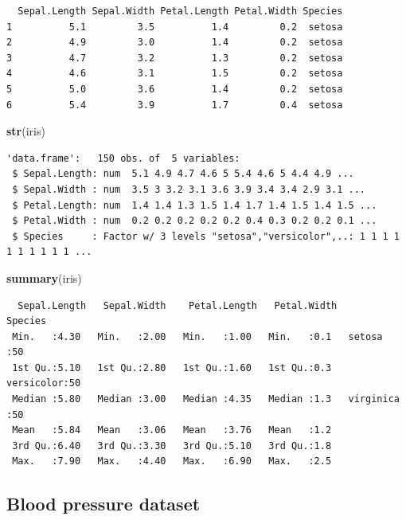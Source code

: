 \documentclass[11pt,a4paper]{book}
\newenvironment{Shaded}{\begin{snugshade}}{\end{snugshade}}
\newcommand{\KeywordTok}[1]{\textcolor[rgb]{0.13,0.29,0.53}{\textbf{#1}}}
\newcommand{\NormalTok}[1]{#1}
\theoremstyle{definition}
\theoremstyle{definition}
\theoremstyle{definition}
\theoremstyle{remark}
\begin{document}
\begin{verbatim}
  Sepal.Length Sepal.Width Petal.Length Petal.Width Species
1          5.1         3.5          1.4         0.2  setosa
2          4.9         3.0          1.4         0.2  setosa
3          4.7         3.2          1.3         0.2  setosa
4          4.6         3.1          1.5         0.2  setosa
5          5.0         3.6          1.4         0.2  setosa
6          5.4         3.9          1.7         0.4  setosa
\end{verbatim}

\begin{Shaded}
\begin{Highlighting}[]
\KeywordTok{str}\NormalTok{(iris)}
\end{Highlighting}
\end{Shaded}

\begin{verbatim}
'data.frame':   150 obs. of  5 variables:
 $ Sepal.Length: num  5.1 4.9 4.7 4.6 5 5.4 4.6 5 4.4 4.9 ...
 $ Sepal.Width : num  3.5 3 3.2 3.1 3.6 3.9 3.4 3.4 2.9 3.1 ...
 $ Petal.Length: num  1.4 1.4 1.3 1.5 1.4 1.7 1.4 1.5 1.4 1.5 ...
 $ Petal.Width : num  0.2 0.2 0.2 0.2 0.2 0.4 0.3 0.2 0.2 0.1 ...
 $ Species     : Factor w/ 3 levels "setosa","versicolor",..: 1 1 1 1 1 1 1 1 1 1 ...
\end{verbatim}

\begin{Shaded}
\begin{Highlighting}[]
\KeywordTok{summary}\NormalTok{(iris)}
\end{Highlighting}
\end{Shaded}

\begin{verbatim}
  Sepal.Length   Sepal.Width    Petal.Length   Petal.Width        Species  
 Min.   :4.30   Min.   :2.00   Min.   :1.00   Min.   :0.1   setosa    :50  
 1st Qu.:5.10   1st Qu.:2.80   1st Qu.:1.60   1st Qu.:0.3   versicolor:50  
 Median :5.80   Median :3.00   Median :4.35   Median :1.3   virginica :50  
 Mean   :5.84   Mean   :3.06   Mean   :3.76   Mean   :1.2                  
 3rd Qu.:6.40   3rd Qu.:3.30   3rd Qu.:5.10   3rd Qu.:1.8                  
 Max.   :7.90   Max.   :4.40   Max.   :6.90   Max.   :2.5                  
\end{verbatim}

\normalsize

\subsection{Blood pressure dataset}\label{blood-pressure-dataset}
\end{document}
